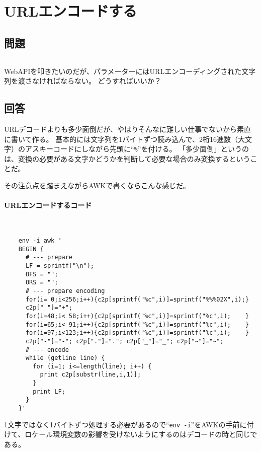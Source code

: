 \section{URLエンコードする}
\label{recipe:URL_encode}

\subsection*{問題}
\noindent
$\!\!\!\!\!$
\begin{grshfboxit}{160.0mm}
	WebAPIを叩きたいのだが、パラメーターにはURLエンコーディングされた文字列を渡さなければならない。
	どうすればいいか？
\end{grshfboxit}

\subsection*{回答}
URLデコードよりも多少面倒だが、やはりそんなに難しい仕事でないから素直に書いて作る。
基本的には文字列を1バイトずつ読み込んで、2桁16進数（大文字）のアスキーコードにしながら先頭に``\verb|%|''を付ける。
「多少面倒」というのは、変換の必要がある文字かどうかを判断して必要な場合のみ変換するということだ。

その注意点を踏まえながらAWKで書くならこんな感じだ。

\paragraph{URLエンコードするコード} 　\\
\begin{frameboxit}{160.0mm}
\begin{verbatim}
	env -i awk '
	BEGIN {
	  # --- prepare
	  LF = sprintf("\n");
	  OFS = "";
	  ORS = "";
	  # --- prepare encoding
	  for(i= 0;i<256;i++){c2p[sprintf("%c",i)]=sprintf("%%%02X",i);}
	  c2p[" "]="+";
	  for(i=48;i< 58;i++){c2p[sprintf("%c",i)]=sprintf("%c",i);    }
	  for(i=65;i< 91;i++){c2p[sprintf("%c",i)]=sprintf("%c",i);    }
	  for(i=97;i<123;i++){c2p[sprintf("%c",i)]=sprintf("%c",i);    }
	  c2p["-"]="-"; c2p["."]="."; c2p["_"]="_"; c2p["~"]="~";
	  # --- encode
	  while (getline line) {
	    for (i=1; i<=length(line); i++) {
	      print c2p[substr(line,i,1)];
	    }
	    print LF;
	  }
	}'
\end{verbatim}
\end{frameboxit}

1文字ではなく1バイトずつ処理する必要があるので``\verb|env -i|''をAWKの手前に付けて、ロケール環境変数の影響を受けないようにするのはデコードの時と同じである。

